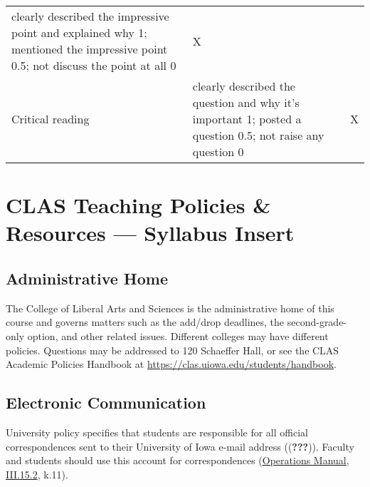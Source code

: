 \documentclass[11pt,]{article}
\theoremstyle{definition}
\theoremstyle{definition}
\theoremstyle{remark}
\begin{document}
\begin{longtable}[]{@{}lll@{}}
\begin{minipage}[t]{0.72\columnwidth}
clearly described the impressive point and explained why 1; mentioned
the impressive point 0.5; not discuss the point at all 0\strut
\end{minipage} & \begin{minipage}[t]{0.04\columnwidth}\raggedright\strut
X\strut
\end{minipage}\tabularnewline
\begin{minipage}[t]{0.16\columnwidth}\raggedright\strut
Critical reading\strut
\end{minipage} & \begin{minipage}[t]{0.72\columnwidth}\raggedright\strut
clearly described the question and why it's important 1; posted a
question 0.5; not raise any question 0\strut
\end{minipage} & \begin{minipage}[t]{0.04\columnwidth}\raggedright\strut
X\strut
\end{minipage}\tabularnewline
\bottomrule
\end{longtable}

\clearpage

\section{CLAS Teaching Policies \& Resources --- Syllabus
Insert}\label{clas-teaching-policies-resources-syllabus-insert}

\subsection{Administrative Home}\label{administrative-home}

The College of Liberal Arts and Sciences is the administrative home of
this course and governs matters such as the add/drop deadlines, the
second-grade-only option, and other related issues. Different colleges
may have different policies. Questions may be addressed to 120 Schaeffer
Hall, or see the CLAS Academic Policies Handbook at
\url{https://clas.uiowa.edu/students/handbook}.

\subsection{Electronic Communication}\label{electronic-communication}

University policy specifies that students are responsible for all
official correspondences sent to their University of Iowa e-mail address
(({\textbf{???}})). Faculty and students should use this account for
correspondences
(\href{https://opsmanual.uiowa.edu/human-resources/professional-ethics-and-academic-responsibility\#15.2}{Operations
Manual, III.15.2}, k.11).
\end{document}
